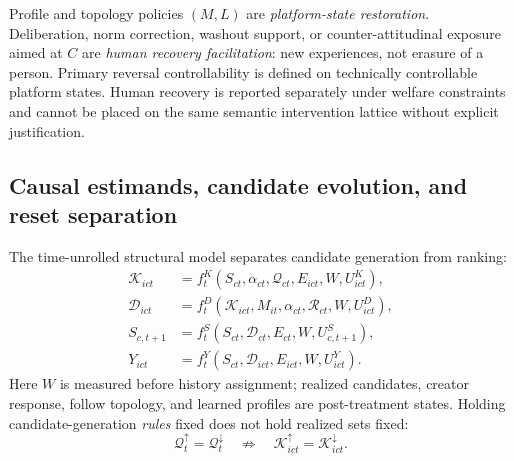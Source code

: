 \documentclass[10pt,a4paper]{article}
\begin{document}
Profile and topology policies $(M,L)$ are \emph{platform-state restoration}. Deliberation, norm correction, washout support, or counter-attitudinal exposure aimed at $C$ are \emph{human recovery facilitation}: new experiences, not erasure of a person. Primary reversal controllability is defined on technically controllable platform states. Human recovery is reported separately under welfare constraints and cannot be placed on the same semantic intervention lattice without explicit justification.

\subsection{Causal estimands, candidate evolution, and reset separation}

The time-unrolled structural model separates candidate generation from ranking:
\begin{align}
\mathcal K_{ict}&=f_t^K(S_{ct},\alpha_{ct},\mathcal Q_{ct},E_{ict},W,U^K_{ict}),
\label{eq:scm-candidates}\\
\mathcal D_{ict}&=f_t^D(\mathcal K_{ict},M_{it},\alpha_{ct},\mathcal R_{ct},W,U^D_{ict}),\\
S_{c,t+1}&=f_t^S(S_{ct},\mathcal D_{ct},E_{ct},W,U^S_{c,t+1}),\\
Y_{ict}&=f_t^Y(S_{ct},\mathcal D_{ict},E_{ict},W,U^Y_{ict}).
\label{eq:scm}
\end{align}
Here $W$ is measured before history assignment; realized candidates, creator response, follow topology, and learned profiles are post-treatment states. Holding candidate-generation \emph{rules} fixed does not hold realized sets fixed:
\begin{equation}
\mathcal Q_t^\uparrow=\mathcal Q_t^\downarrow
\quad\not\Rightarrow\quad
\mathcal K_{ict}^\uparrow=\mathcal K_{ict}^\downarrow.
\end{equation}
\end{document}
